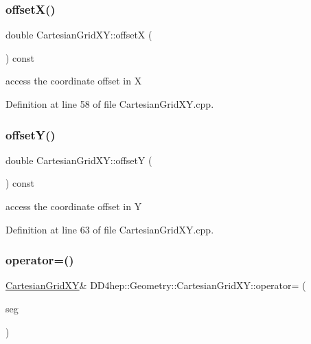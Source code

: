 \subsubsection{\texorpdfstring{offset\+X()}{offsetX()}}
{\footnotesize\ttfamily double Cartesian\+Grid\+X\+Y\+::offsetX (\begin{DoxyParamCaption}{ }\end{DoxyParamCaption}) const}



access the coordinate offset in X 



Definition at line 58 of file Cartesian\+Grid\+X\+Y.\+cpp.

\hypertarget{class_d_d4hep_1_1_geometry_1_1_cartesian_grid_x_y_a353eae656ad21d92134d280567b91499}{}\label{class_d_d4hep_1_1_geometry_1_1_cartesian_grid_x_y_a353eae656ad21d92134d280567b91499} 
\subsubsection{\texorpdfstring{offset\+Y()}{offsetY()}}
{\footnotesize\ttfamily double Cartesian\+Grid\+X\+Y\+::offsetY (\begin{DoxyParamCaption}{ }\end{DoxyParamCaption}) const}



access the coordinate offset in Y 



Definition at line 63 of file Cartesian\+Grid\+X\+Y.\+cpp.

\hypertarget{class_d_d4hep_1_1_geometry_1_1_cartesian_grid_x_y_a56de7a63a2bd5be8f60e7c54696ca4c7}{}\label{class_d_d4hep_1_1_geometry_1_1_cartesian_grid_x_y_a56de7a63a2bd5be8f60e7c54696ca4c7} 
\subsubsection{\texorpdfstring{operator=()}{operator=()}}
{\footnotesize\ttfamily \hyperlink{class_d_d4hep_1_1_geometry_1_1_cartesian_grid_x_y}{Cartesian\+Grid\+XY}\& D\+D4hep\+::\+Geometry\+::\+Cartesian\+Grid\+X\+Y\+::operator= (\begin{DoxyParamCaption}\item[{const \hyperlink{class_d_d4hep_1_1_geometry_1_1_cartesian_grid_x_y}{Cartesian\+Grid\+XY} \&}]{seg }\end{DoxyParamCaption})\hspace{0.3cm}{\ttfamily [default]}}



